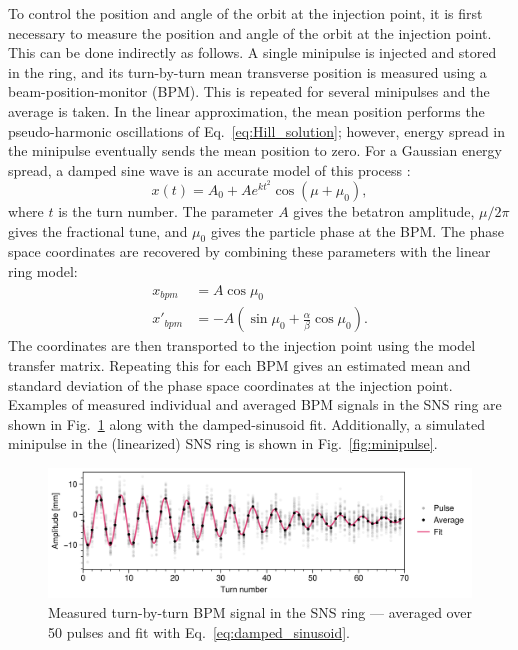 To control the position and angle of the orbit at the injection point, it is first necessary to measure the position and angle of the orbit at the injection point. This can be done indirectly as follows. A single minipulse is injected and stored in the ring, and its turn-by-turn mean transverse position is measured using a beam-position-monitor (BPM). This is repeated for several minipulses and the average is taken. In the linear approximation, the mean position performs the pseudo-harmonic oscillations of Eq.~\eqref{eq:Hill_solution}; however, energy spread in the minipulse eventually sends the mean position to zero. For a Gaussian energy spread, a damped sine wave is an accurate model of this process \cite{Pelaia2016}:
%
\begin{equation}\label{eq:damped_sinusoid}
    x(t) = A_0 + A e^{kt^2} \cos{\left(\mu + \mu_0\right)},
\end{equation}
%
where $t$ is the turn number. The parameter $A$ gives the betatron amplitude, $\mu / 2\pi$ gives the fractional tune, and $\mu_0$ gives the particle phase at the BPM. The phase space coordinates are recovered by combining these parameters with the linear ring model:
%
\begin{equation}
\begin{aligned}
    x_{bpm} &= A \cos\mu_0 \\ 
    x'_{bpm} &= -A\left({\sin\mu_0 + \frac{\alpha}{\beta}\cos\mu_0}\right).
\end{aligned}
\end{equation}
%
The coordinates are then transported to the injection point using the model transfer matrix. Repeating this for each BPM gives an estimated mean and standard deviation of the phase space coordinates at the injection point. Examples of measured individual and averaged BPM signals in the SNS ring are shown in Fig.~\ref{fig:bpm_avg} along with the damped-sinusoid fit. Additionally, a simulated minipulse in the (linearized) SNS ring is shown in Fig.~\ref{fig:minipulse}.
%
\begin{figure}[!p]
    \centering
    \includegraphics[width=\textwidth]{Images/chapter1/bpm_avg.png}
    \caption{Measured turn-by-turn BPM signal in the SNS ring — averaged over 50 pulses and fit with Eq.~\eqref{eq:damped_sinusoid}.}
    \label{fig:bpm_avg}
\end{figure}
